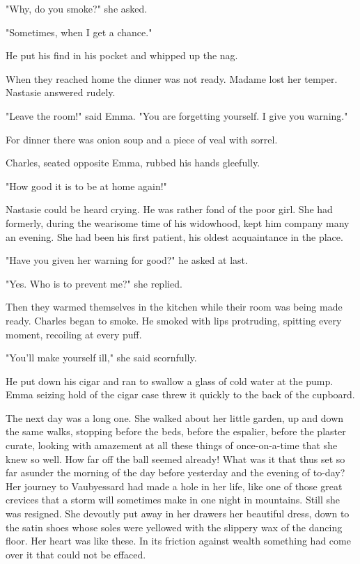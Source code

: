 \documentclass{tufte-book}
\begin{document}
"Why, do you smoke?" she asked.

"Sometimes, when I get a chance."

He put his find in his pocket and whipped up the nag.

When they reached home the dinner was not ready. Madame lost her temper.
Nastasie answered rudely.

"Leave the room!" said Emma. "You are forgetting yourself. I give you
warning."

For dinner there was onion soup and a piece of veal with sorrel.

Charles, seated opposite Emma, rubbed his hands gleefully.

"How good it is to be at home again!"

Nastasie could be heard crying. He was rather fond of the poor girl.
She had formerly, during the wearisome time of his widowhood, kept him
company many an evening. She had been his first patient, his oldest
acquaintance in the place.

"Have you given her warning for good?" he asked at last.

"Yes. Who is to prevent me?" she replied.

Then they warmed themselves in the kitchen while their room was being
made ready. Charles began to smoke. He smoked with lips protruding,
spitting every moment, recoiling at every puff.

"You'll make yourself ill," she said scornfully.

He put down his cigar and ran to swallow a glass of cold water at the
pump. Emma seizing hold of the cigar case threw it quickly to the back
of the cupboard.

The next day was a long one. She walked about her little garden, up
and down the same walks, stopping before the beds, before the espalier,
before the plaster curate, looking with amazement at all these things
of once-on-a-time that she knew so well. How far off the ball seemed
already! What was it that thus set so far asunder the morning of the day
before yesterday and the evening of to-day? Her journey to Vaubyessard
had made a hole in her life, like one of those great crevices that
a storm will sometimes make in one night in mountains. Still she was
resigned. She devoutly put away in her drawers her beautiful dress, down
to the satin shoes whose soles were yellowed with the slippery wax of
the dancing floor. Her heart was like these. In its friction against
wealth something had come over it that could not be effaced.
\end{document}
